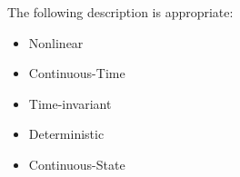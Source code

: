 The following description is appropriate:
\begin{itemize}
    \item Nonlinear
    \item Continuous-Time
    \item Time-invariant
    \item Deterministic
    \item Continuous-State
\end{itemize}